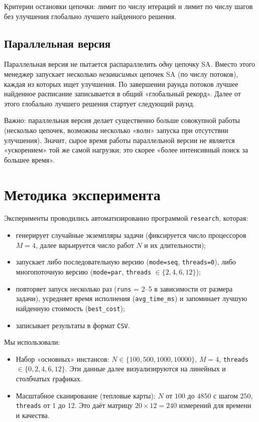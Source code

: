 \documentclass[a4paper,12pt]{article}
\begin{document}
Критерии остановки цепочки: лимит по числу итераций и лимит по числу шагов без улучшения глобально лучшего найденного решения.

\subsection*{Параллельная версия}

Параллельная версия не пытается распараллелить \emph{одну} цепочку SA. Вместо этого менеджер запускает несколько \emph{независимых} цепочек SA (по числу потоков), каждая из которых ищет улучшения. По завершении раунда потоков лучшее найденное расписание записывается в общий «глобальный рекорд». Далее от этого глобально лучшего решения стартует следующий раунд.

Важно: параллельная версия делает существенно больше совокупной работы (несколько цепочек, возможны несколько «волн» запуска при отсутствии улучшения). Значит, сырое время работы параллельной версии не является «ускорением» той же самой нагрузки; это скорее «более интенсивный поиск за большее время».

\section{Методика эксперимента}

Эксперименты проводились автоматизированно программой \texttt{research}, которая:
\begin{itemize}
    \item генерирует случайные экземпляры задачи (фиксируется число процессоров $M=4$, далее варьируется число работ $N$ и их длительности);
    \item запускает либо последовательную версию (\texttt{mode=seq}, \texttt{threads=0}), либо многопоточную версию (\texttt{mode=par}, \texttt{threads} $\in \{2,4,6,12\}$);
    \item повторяет запуск несколько раз (\texttt{runs} = 2--5 в зависимости от размера задачи), усредняет время исполнения (\texttt{avg\_time\_ms}) и запоминает лучшую найденную стоимость (\texttt{best\_cost});
    \item записывает результаты в формат \texttt{CSV}.
\end{itemize}

Мы использовали:
\begin{itemize}
    \item Набор «основных» инстансов: $N \in \{100, 500, 1000, 10000\}$, $M=4$, \texttt{threads} $\in \{0,2,4,6,12\}$. Эти данные далее визуализируются на линейных и столбчатых графиках.
    \item Масштабное сканирование (тепловые карты): $N$ от $100$ до $4850$ с шагом $250$, \texttt{threads} от $1$ до $12$. Это даёт матрицу $20 \times 12 = 240$ измерений для времени и качества.
\end{itemize}
\end{document}
